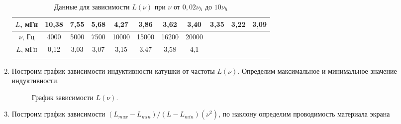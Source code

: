 \documentclass[a4paper, 12pt]{article}%
\begin{document}
\begin{enumerate}
\begin{longtable} {|c|c|c|c|c|c|c|c|c|c|c|}
		$L$, мГн & 10,38 & 7,55 & 5,68 & 4,27 & 3,86 & 3,62 & 3,40 & 3,35 & 3,22 & 3,09 \\ \hline
		
		\hline
		\hline
		
		$\nu$, Гц & 4000 & 5000 & 7500 & 10000 & 15000 & 16200 & 20000 &  &  &    \\ \hline
		
		$L$, мГн  & 0,12 & 3,03 & 3,07 & 3,15 & 3,47 & 3,58 & 4,1 &  &  &   \\ \hline
		
		\caption{Данные для зависимости $L(\nu)$ при $\nu \text{ от } 0,02\nu_h \text{ до }  10\nu_h$}
	\end{longtable}	
		
	
	\item Построим график зависимости индуктивности катушки от частоты $L(\nu)$. Определим максимальное и минимальное значение индуктивности.
	
	\begin{figure}[H]
		\caption{График зависимости $L(\nu)$.}
	\end{figure}
	
	\newpage
	
	\item Построим график зависимости $(L_{max} - L_{min})/(L - L_{min})(\nu^2)$, по наклону определим проводимость материала экрана
	

\end{enumerate}
\end{document}
